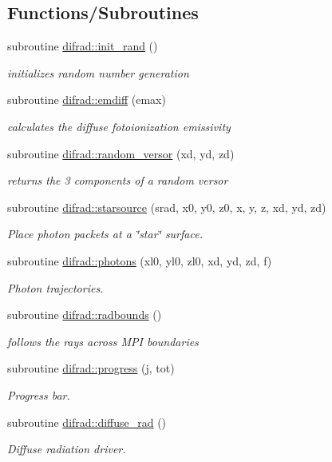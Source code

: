 \subsection*{Functions/\+Subroutines}
\begin{DoxyCompactItemize}
\item 
subroutine \hyperlink{namespacedifrad_a9bce19025195159710828548c95282dc}{difrad\+::init\+\_\+rand} ()
\begin{DoxyCompactList}\small\item\em initializes random number generation \end{DoxyCompactList}\item 
subroutine \hyperlink{namespacedifrad_a1ccb144621689571d836f2f76c5fabae}{difrad\+::emdiff} (emax)
\begin{DoxyCompactList}\small\item\em calculates the diffuse fotoionization emissivity \end{DoxyCompactList}\item 
subroutine \hyperlink{namespacedifrad_ac7efbacd89420f5c298f7fb666ba14f9}{difrad\+::random\+\_\+versor} (xd, yd, zd)
\begin{DoxyCompactList}\small\item\em returns the 3 components of a random versor \end{DoxyCompactList}\item 
subroutine \hyperlink{namespacedifrad_a180fbbe2c9b0639cc33dd6ef57a61ec4}{difrad\+::starsource} (srad, x0, y0, z0, x, y, z, xd, yd, zd)
\begin{DoxyCompactList}\small\item\em Place photon packets at a \char`\"{}star\char`\"{} surface. \end{DoxyCompactList}\item 
subroutine \hyperlink{namespacedifrad_a39291c8aa2927c69ef6ca60f78c9b103}{difrad\+::photons} (xl0, yl0, zl0, xd, yd, zd, f)
\begin{DoxyCompactList}\small\item\em Photon trajectories. \end{DoxyCompactList}\item 
subroutine \hyperlink{namespacedifrad_afe6e9d2182e755ae483aeaa2c91f2710}{difrad\+::radbounds} ()
\begin{DoxyCompactList}\small\item\em follows the rays across M\+P\+I boundaries \end{DoxyCompactList}\item 
subroutine \hyperlink{namespacedifrad_a17151a5334db41fd14315d454e883b8e}{difrad\+::progress} (j, tot)
\begin{DoxyCompactList}\small\item\em Progress bar. \end{DoxyCompactList}\item 
subroutine \hyperlink{namespacedifrad_aeec1cd3dae50e6946aadb42abef934ec}{difrad\+::diffuse\+\_\+rad} ()
\begin{DoxyCompactList}\small\item\em Diffuse radiation driver. \end{DoxyCompactList}\end{DoxyCompactItemize}
